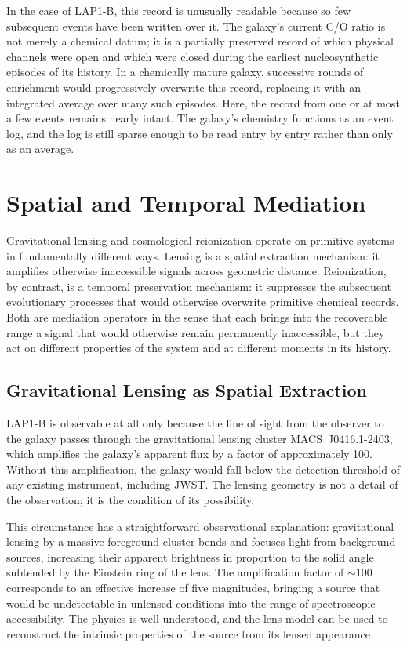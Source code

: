 \documentclass[12pt, a4paper]{article}
\theoremstyle{definition}
\begin{document}
In the case of LAP1-B, this record is unusually readable because so few
subsequent events have been written over it. The galaxy's current C/O ratio
is not merely a chemical datum; it is a partially preserved record of which
physical channels were open and which were closed during the earliest
nucleosynthetic episodes of its history. In a chemically mature galaxy,
successive rounds of enrichment would progressively overwrite this record,
replacing it with an integrated average over many such episodes. Here, the
record from one or at most a few events remains nearly intact. The galaxy's
chemistry functions as an event log, and the log is still sparse enough to
be read entry by entry rather than only as an average.

\section{Spatial and Temporal Mediation}
\label{sec:mediation}

Gravitational lensing and cosmological reionization operate on primitive
systems in fundamentally different ways. Lensing is a spatial extraction
mechanism: it amplifies otherwise inaccessible signals across geometric
distance. Reionization, by contrast, is a temporal preservation mechanism:
it suppresses the subsequent evolutionary processes that would otherwise
overwrite primitive chemical records. Both are mediation operators in the
sense that each brings into the recoverable range a signal that would
otherwise remain permanently inaccessible, but they act on different
properties of the system and at different moments in its history.

\subsection{Gravitational Lensing as Spatial Extraction}

LAP1-B is observable at all only because the line of sight from the observer
to the galaxy passes through the gravitational lensing cluster
MACS~J0416.1-2403, which amplifies the galaxy's apparent flux by a factor
of approximately 100. Without this amplification, the galaxy would fall below
the detection threshold of any existing instrument, including JWST. The
lensing geometry is not a detail of the observation; it is the condition of
its possibility.

This circumstance has a straightforward observational explanation:
gravitational lensing by a massive foreground cluster bends and focuses
light from background sources, increasing their apparent brightness in
proportion to the solid angle subtended by the Einstein ring of the lens.
The amplification factor of $\sim 100$ corresponds to an effective increase
of five magnitudes, bringing a source that would be undetectable in unlensed
conditions into the range of spectroscopic accessibility. The physics is
well understood, and the lens model can be used to reconstruct the intrinsic
properties of the source from its lensed appearance.
\end{document}

